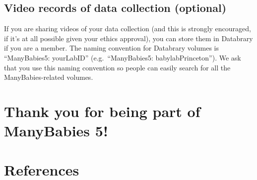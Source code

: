 \documentclass[
  letterpaper,
  DIV=11,
  numbers=noendperiod,
  oneside]{scrreprt}
\begin{document}
\section{Video records of data collection
(optional)}\label{video-records-of-data-collection-optional}

If you are sharing videos of your data collection (and this is strongly
encouraged, if it's at all possible given your ethics approval), you can
store them in Databrary if you are a member. The naming convention for
Databrary volumes is ``ManyBabies5: yourLabID'' (e.g.~``ManyBabies5:
babylabPrinceton''). We ask that you use this naming convention so
people can easily search for all the ManyBabies-related volumes.

\chapter*{Thank you for being part of ManyBabies
5!}\label{thank-you-for-being-part-of-manybabies-5}



\chapter*{References}\label{references}

\end{document}
